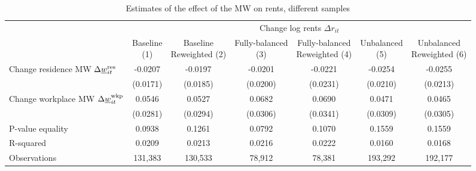 \begin{landscape}
\begin{table}[hbt!]
    \centering
    \caption{Estimates of the effect of the MW on rents, different samples}
    \label{tab:static_sample}

    \begin{tabular}{@{}lcccccc@{}}
        \toprule
                                             & \multicolumn{6}{c}{Change log rents $\Delta r_{it}$}                   \\ \cmidrule(l){2-7} 
                                             & \shortstack{Baseline\\(1)}       & \shortstack{Baseline\\Reweighted (2)}
                                             & \shortstack{Fully-balanced\\(3)} & \shortstack{Fully-balanced\\Reweighted (4)}  
                                             & \shortstack{Unbalanced\\(5)}     & \shortstack{Unbalanced\\Reweighted (6)}  \\ \midrule
        Change residence MW 
                  $\Delta\underline{w}_{it}^{\text{res}}$    & -0.0207      & -0.0197        & -0.0201       & -0.0221    & -0.0254       & -0.0255     \\
                                             & (0.0171)    & (0.0185)      & (0.0200)     & (0.0231)  & (0.0210)     & (0.0213)   \\
        Change workplace MW 
                   $\Delta\underline{w}_{it}^{\text{wkp}}$   & 0.0546      & 0.0527        & 0.0682       & 0.0690    & 0.0471       & 0.0465     \\
                                             & (0.0281)    & (0.0294)      & (0.0306)     & (0.0341)  & (0.0309)     & (0.0305)   \\ \midrule
        P-value equality                     & 0.0938      & 0.1261        & 0.0792       & 0.1070    & 0.1559       & 0.1559     \\
        R-squared                            & 0.0209      & 0.0213        & 0.0216       & 0.0222    & 0.0160       & 0.0168     \\
        Observations                         & 131,383     & 130,533       & 78,912      & 78,381   & 193,292      & 192,177    \\ \bottomrule
    \end{tabular}


\end{table}
\end{landscape}
